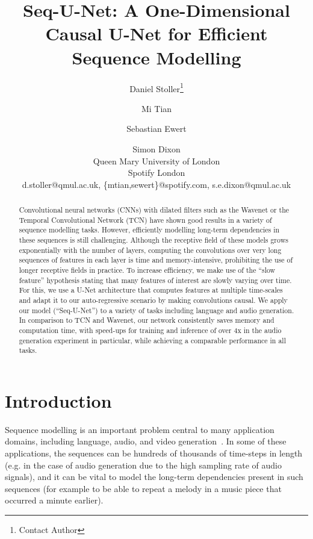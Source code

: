 \documentclass{article}
\title{Seq-U-Net: A One-Dimensional Causal U-Net for Efficient Sequence Modelling}
\author{
Daniel Stoller\footnote{Contact Author}\and
Mi Tian\and
Sebastian Ewert\and
Simon Dixon\\
\affiliations
Queen Mary University of London\\
Spotify London\\
\emails
d.stoller@qmul.ac.uk,
\{mtian,sewert\}@spotify.com,
s.e.dixon@qmul.ac.uk
}
\begin{document}
\maketitle

\begin{abstract}
Convolutional neural networks (CNNs) with dilated filters such as the Wavenet or the Temporal Convolutional Network (TCN) have shown good results in a variety of sequence modelling tasks.
However, efficiently modelling long-term dependencies in these sequences is still challenging.
Although the receptive field of these models grows exponentially with the number of layers, computing the convolutions over very long sequences of features in each layer is time and memory-intensive, prohibiting the use of longer receptive fields in practice.
To increase efficiency, we make use of the ``slow feature'' hypothesis stating that many features of interest are slowly varying over time.
For this, we use a U-Net architecture that computes features at multiple time-scales and adapt it to our auto-regressive scenario by making convolutions causal.
We apply our model (``Seq-U-Net'') to a variety of tasks including language and audio generation.
In comparison to TCN and Wavenet, our network consistently saves memory and computation time, with speed-ups for training and inference of over 4x in the audio generation experiment in particular, while achieving a comparable performance in all tasks.
\end{abstract}

\section{Introduction}

Sequence modelling is an important problem central to many application domains, including language, audio, and video generation~\cite{bai2018convolutional,yuSeqGANSequence2017,trinhLearningLongerterm2018}.
In some of these applications, the sequences can be hundreds of thousands of time-steps in length (e.g. in the case of audio generation due to the high sampling rate of audio signals), and it can be vital to model the long-term dependencies present in such sequences (for example to be able to repeat a melody in a music piece that occurred a minute earlier).
\end{document}
